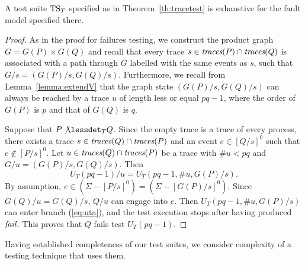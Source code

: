\begin{lemma}\label{lemma:mainfexhaustivetrace}
A test suite ${\text{TS}}_T$ specified as in Theorem~\ref{th:tracetest} is
exhaustive for the fault model specified there.
\end{lemma}
\begin{proof}
As in the proof for failures testing, we construct the product graph
$G=G(P)\times G(Q)$ and recall that every trace $s\in\text{\it traces}(P)\cap\text{\it traces}(Q)$ is
associated with a path through $G$ labelled with the same events as $s$, such
that $G/s = (G(P)/s,G(Q)/s)$. Furthermore, we recall from
Lemma~\ref{lemma:extendV} that the graph state $(G(P)/s,G(Q)/s)$ can always
be reached by a trace $u$ of length less or equal $pq-1$, where  the order of
$G(P)$ is $p$ and that of $G(Q)$ is $q$.

Suppose that $P\not\lessdet_T Q$. Since the empty trace is a trace of every
process, there exists a trace $s\in \text{\it traces}(Q)\cap\text{\it traces}(P)$ and an event $e\in
[Q/s]^0$ such that $e\not\in [P/s]^0$. Let $u\in \text{\it traces}(Q)\cap\text{\it traces}(P)$ be a
trace with $\#u < pq$ and $G/u = (G(P)/s,G(Q)/s)$. Then
$$
U_T(pq-1)/u = U_T(pq-1,\#u,G(P)/s).
$$
By assumption, $e\in (\Sigma -[P/s]^0) = (\Sigma - [G(P)/s]^0)$. Since
$G(Q)/u = G(Q)/s$, $Q/u$ can engage into $e$. Then $U_T(pq-1,\#u,G(P)/s)$ can
enter branch (\ref{eq:uta}), and the test execution stops after having
produced ${\text{\it fail}}$. This proves that $Q$  fails test $U_T(pq-1)$. \xbox
\end{proof}
%
Having established completeness of our test suites, we consider
complexity of a testing technique that uses them.

